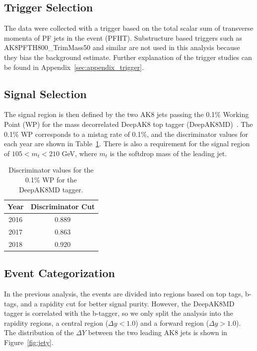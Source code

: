 \subsection{Trigger Selection}
\label{sec:trigeff}


The data were collected with a trigger based on the total scalar sum of transverse momenta of PF jets in the event (PFHT). Substructure based triggers such as AK8PFTH800\_TrimMass50 and similar are not used in this analysis because they bias the background estimate. Further explanation of the trigger studies can be found in Appendix~\ref{sec:appendix_trigger}.


\subsection{Signal Selection}
\label{sec:signal}

The signal region is then defined by the two AK8 jets passing the 0.1\% Working Point (WP) for the mass decorrelated DeepAK8 top tagger (DeepAK8MD)~\cite{DeepAK8TopTagwiki}. The 0.1\% WP corresponds to a mistag rate of 0.1\%, and the discriminator values for each year are shown in Table~\ref{tab:deepak8}. There is also a requirement for the signal region of $105 < m_t < 210$ GeV, where $m_t$ is the softdrop mass of the leading jet.

\begin{table}[h!]
	\centering
	\begin{tabular}{|| c c  ||} 
		\hline
		Year & Discriminator Cut \\ 
		\hline\hline
		2016 & 0.889  \\ 
		2017 & 0.863  \\ 
		2018 & 0.920  \\ 
		\hline
	\end{tabular}
	\caption{Discriminator values for the 0.1\% WP for the DeepAK8MD tagger.}
	\label{tab:deepak8}
\end{table}


\subsection{Event Categorization}
\label{sec:selection}




In the previous analysis, the events are divided into regions based on top tags, b-tags, and a rapidity cut for better signal purity. However, the DeepAK8MD tagger is correlated with the b-tagger, so we only split the analysis into the rapidity regions, a central region ($\Delta y < 1.0$) and a forward region ($\Delta y > 1.0$). The distribution of the $\Delta Y$ between the two leading AK8 jets is shown in Figure~\ref{fig:jety}.


